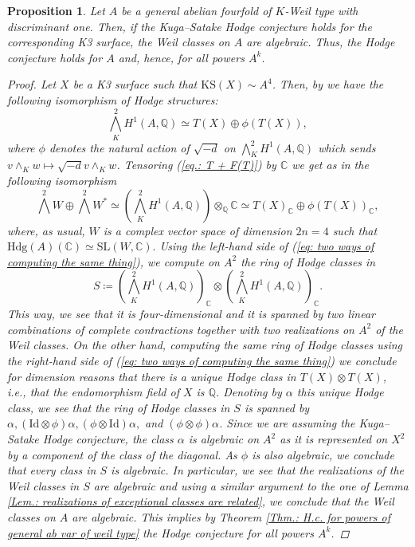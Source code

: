 \documentclass[11pt,twoside,a4paper]{amsart}
\newcommand{\0}{\mathscr{O}}
\newcommand{\Q}{\mathbb{Q}}
\newcommand{\C}{\mathbb{C}}
\theoremstyle{plain}
\newtheorem{prop}[thm]{Proposition}
\theoremstyle{definition}
\theoremstyle{remark}
\begin{document}
\begin{prop}
\label{prop. KSH implies H conj for ab 4}
Let $A$ be a general abelian fourfold of $K$-Weil type with discriminant one. Then, if the Kuga--Satake Hodge conjecture holds for the corresponding K3 surface, the Weil classes on $A$ are algebraic. Thus, the Hodge conjecture holds for $A$ and, hence, for all powers $A^k$.
\begin{proof}
Let $X$ be a K3 surface such that $\mathrm{KS}(X)\sim A^4$. Then, by \cite[Thm.\ 3.8]{lombardo01kugasatake} we have the following isomorphism of Hodge structures:
\begin{equation}
\label{eq.: T + F(T)}
\textstyle
\bigwedge^2_K H^1(A,\Q)\simeq T(X)\oplus \phi(T(X)),
\end{equation}
where $\phi$ denotes the natural action of $\sqrt{-d}$ on $\bigwedge^2_K H^1(A,\Q)$ which sends $v\wedge_K w\mapsto \sqrt{-d}v\wedge_K w$. 
Tensoring (\ref{eq.: T + F(T)}) by $\C$ we get as in \cite[Prop.\ 4.4]{deligne1982hodge} the following isomorphism
\begin{equation}
\label{eq: two ways of computing the same thing}
\textstyle
\bigwedge^2 W\oplus \bigwedge^2 W^*\simeq\left(\bigwedge^2_K H^1(A,\Q)\right)\otimes_\Q \C\simeq T(X)_\C\oplus \phi(T(X))_\C,
\end{equation}
where, as usual, $W$ is a complex vector space of dimension $2n=4$ such that $\mathrm{Hdg}(A)(\C)\simeq\mathrm{SL}(W,\C).$
Using the left-hand side of (\ref{eq: two ways of computing the same thing}), we compute on $A^2$ the ring of Hodge classes in
\[
\textstyle S\coloneqq\left(\bigwedge^2_K H^1(A,\Q)\right)_\C\otimes \left(\bigwedge^2_K H^1(A,\Q)\right)_\C.
\]
This way, we see that it is four-dimensional and it is spanned by two linear combinations of complete contractions together with two realizations on $A^2$ of the Weil classes. On the other hand, computing the same ring of Hodge classes using the right-hand side of (\ref{eq: two ways of computing the same thing}) we conclude for dimension reasons that there is a unique Hodge class in $T(X)\otimes T(X)$, i.e., that the endomorphism field of $X$ is $\Q$. Denoting by $\alpha$ this unique Hodge class, we see that the ring of Hodge classes in $S$ is spanned by $\alpha, (\mathrm{Id}\otimes \phi) \alpha , (\phi\otimes\mathrm{Id})\alpha,$ and $(\phi\otimes \phi)\alpha$. Since we are assuming the Kuga--Satake Hodge conjecture, the class $\alpha$ is algebraic on $A^2$ as it is represented on $X^2$ by a component of the class of the diagonal. As $\phi$ is also algebraic, we conclude that every class in $S$ is algebraic. In particular, we see that the realizations of the Weil classes in $S$ are algebraic and using a similar argument to the one of Lemma \ref{Lem.: realizations of exceptional classes are related}, we conclude that the Weil classes on $A$ are algebraic. This implies by Theorem \ref{Thm.: H.c. for powers of general ab var of weil type} the Hodge conjecture for all powers $A^k$.
\end{proof}
\end{prop}
\end{document}
